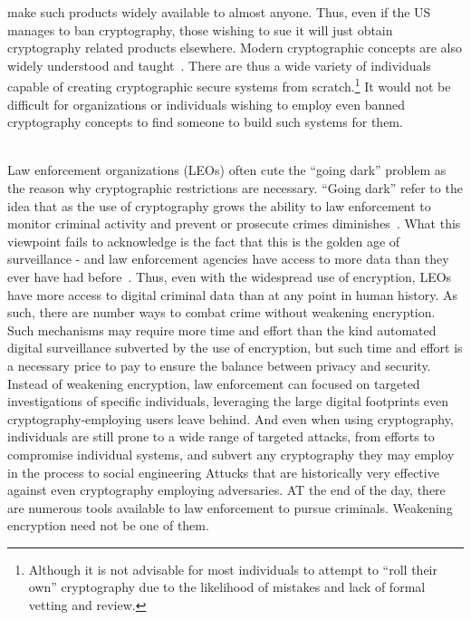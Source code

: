\begin{packed_desc}
  make such products widely available to almost anyone. Thus, even if
  the US manages to ban cryptography, those wishing to sue it will
  just obtain cryptography related products elsewhere. Modern
  cryptographic concepts are also widely understood and
  taught~\cite{schneier2010crypto}. There are thus a wide variety of
  individuals capable of creating cryptographic secure systems from
  scratch.\footnote{Although it is not advisable for most individuals
    to attempt to ``roll their own'' cryptography due to the
    likelihood of mistakes and lack of formal vetting and review.} It
  would not be difficult for organizations or individuals wishing to
  employ even banned cryptography concepts to find someone to build
  such systems for them.
\item[Better Options] \hfill \\ Law enforcement organizations (LEOs)
  often cute the ``going dark'' problem as the reason why
  cryptographic restrictions are necessary. ``Going dark'' refer to
  the idea that as the use of cryptography grows the ability to law
  enforcement to monitor criminal activity and prevent or prosecute
  crimes diminishes~\cite{anderson2013}. What this viewpoint fails to
  acknowledge is the fact that this is the golden age of surveillance
  - and law enforcement agencies have access to more data than they
  ever have had before~\cite{swire2011}. Thus, even with the
  widespread use of encryption, LEOs have more access to digital
  criminal data than at any point in human history. As such, there are
  number ways to combat crime without weakening encryption. Such
  mechanisms may require more time and effort than the kind automated
  digital surveillance subverted by the use of encryption, but such
  time and effort is a necessary price to pay to ensure the balance
  between privacy and security. Instead of weakening encryption, law
  enforcement can focused on targeted investigations of specific
  individuals, leveraging the large digital footprints even
  cryptography-employing users leave behind. And even when using
  cryptography, individuals are still prone to a wide range of
  targeted attacks, from efforts to compromise individual systems, and
  subvert any cryptography they may employ in the process to social
  engineering Attucks that are historically very effective against
  even cryptography employing adversaries. AT the end of the day,
  there are numerous tools available to law enforcement to pursue
  criminals. Weakening encryption need not be one of them.
\end{packed_desc}

